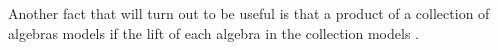 \begin{code}
\>[4]\AgdaSpace{}%
\AgdaSymbol{:}\AgdaSpace{}%
\AgdaSpace{}%
\AgdaSpace{}%
\AgdaSpace{}%
\AgdaSymbol{(}\AgdaSpace{}%
\AgdaSymbol{)}\AgdaSpace{}%
\AgdaSpace{}%
\AgdaSpace{}%
\AgdaSpace{}%
\<%
\\
%
\>[4]\AgdaSpace{}%
\AgdaSpace{}%
\AgdaSymbol{=}\AgdaSpace{}%
\AgdaSpace{}%
\AgdaSymbol{(}\AgdaSpace{}%
\AgdaSymbol{)}\<%
\\
%
\\[\AgdaEmptyExtraSkip]%
%
\>[4]\AgdaSpace{}%
\AgdaSymbol{:}\AgdaSpace{}%
\AgdaSpace{}%
\AgdaSpace{}%
\AgdaSpace{}%
\AgdaSpace{}%
\AgdaSpace{}%
\AgdaSpace{}%
\AgdaSpace{}%
\AgdaSpace{}%
\<%
\\
%
\>[4]\AgdaSpace{}%
\AgdaSymbol{=}\AgdaSpace{}%
\AgdaSpace{}%
\AgdaSpace{}%
\AgdaSpace{}%
\AgdaSpace{}%
\AgdaSpace{}%
\<%
\end{code}
\ccpad
Another fact that will turn out to be useful is that a product of a collection of algebras models  if the lift of each algebra in the collection models .
\ccpad
